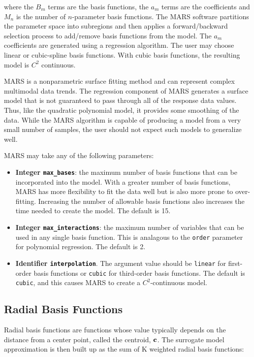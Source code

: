 \documentclass{article}
\begin{document}
where the $B_{m}$ terms are the basis functions, the $a_{m}$ terms are the coefficients and $M_n$ is the number of $n$-parameter basis functions. The MARS software partitions the parameter space into subregions and then
applies a forward/backward selection process to add/remove basis functions from the model.  The $a_m$ coefficients are generated using a regression algorithm.  The user may choose linear or cubic-spline basis functions.  With cubic basis functions, the resulting model is $C^2$ continuous.  

MARS is a nonparametric surface fitting method and can represent
complex multimodal data trends. The regression component of MARS
generates a surface model that is not guaranteed to pass through all
of the response data values. Thus, like the quadratic polynomial
model, it provides some smoothing of the data.  While the MARS algorithm is capable of producing a model from a very small number of samples, the user should not expect such models to generalize well.   

MARS may take any of the following parameters:
\begin{itemize}
\item {\bf Integer \texttt{max\_bases}}: the maximum number of basis functions that can be incorporated into the model.  With a greater number of basis functions, MARS has more flexibility to fit the data well but is also more prone to over-fitting.  Increasing the number of allowable basis functions also increases the time needed to create the model.  The default is 15.
\item {\bf Integer \texttt{max\_interactions}}: the maximum number of variables that can be used in any single basis function.  This is analagous to the \texttt{order} parameter for polynomial regression.  The default is 2.
\item {\bf Identifier \texttt{interpolation}}.  The argument value should be \texttt{linear} for first-order basis functions or \texttt{cubic} for third-order basis functions.  The default is \texttt{cubic}, and this causes MARS to create a $C^2$-continuous model.
\end{itemize}

\subsection{Radial Basis Functions}\label{models:surf:rbf}

Radial basis functions are functions whose value typically depends on the 
distance from a center point, called the centroid, ${\bf c}$. 
The surrogate model approximation is then built up as the sum of K 
weighted radial basis functions: 
\end{document}
